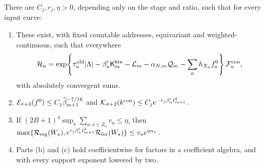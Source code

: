\begin{samepage}
\begin{lemma}\label{lem:D-connected}
There are $C_j,r_j,\eta>0$, depending only on the stage and ratio, such that for every input curve:
\begin{enumerate}
\item[(a)] These exist, with fixed countable addresses, equivariant and weighted-continuous, such that everywhere
\begin{equation*}
\mathcal H_u=\exp\!\left\{\tau_u^{\rm old}|\Lambda|-\beta'_u\mathsf K_m^{\rm kin}
-\mathcal L_m-\alpha_{N,m}\mathcal Q_m-\sum_a h_{X_a}f_a^0\right\}\mathcal F_u^{\rm con},
\end{equation*}
with absolutely convergent sums.
\item[(b)] $\mathcal E_{\sigma+3}(f^0)\le C_j\widehat{\beta}_{m+1}^{-7/16}$ and $\mathcal K_{\sigma+2}(k^{\rm con})\le C_je^{-r_j\beta'_u t_{m+1}^2}$.
\item[(c)] If $(2B+1)^4\sup_x\sum_{a:x\in Z_a}v_a\le\eta$, then $\max\{\mathcal R_{\rm reg}(W_\star),e^{r_j\beta'_ut_{m+1}^2}\mathcal R_{\rm for}(W_\star)\}\le v_\star e^{\eta n_\star}$.
\item[(d)] Parts (b) and (c) hold coefficientwise for factors in a coefficient algebra, and with every support exponent lowered by two.
\end{enumerate}
\end{lemma}
\end{samepage}
